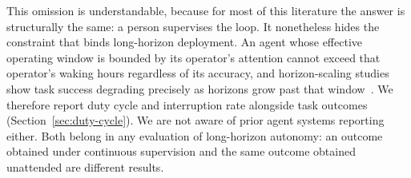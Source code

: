 This omission is understandable, because for most of this literature the answer is
structurally the same: a person supervises the loop. It nonetheless hides the
constraint that binds long-horizon deployment. An agent whose effective operating
window is bounded by its operator's attention cannot exceed that operator's waking
hours regardless of its accuracy, and horizon-scaling studies show task success
degrading precisely as horizons grow past that window~\citep{kwa2025longtasks}. We
therefore report duty cycle and interruption rate alongside task outcomes
(Section~\ref{sec:duty-cycle}). We are not aware of prior agent systems reporting
either. Both belong in any evaluation of long-horizon autonomy: an outcome obtained
under continuous supervision and the same outcome obtained unattended are different
results.
